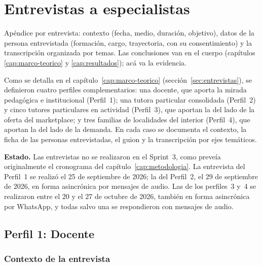 
\chapter{Entrevistas a especialistas}\label{apx:entrevista}

\begin{guia}
Apéndice por entrevista: contexto (fecha, medio, duración, objetivo),
datos de la persona entrevistada (formación, cargo, trayectoria, con su
consentimiento) y la transcripción organizada por temas. Las
conclusiones van en el cuerpo (capítulos \ref{cap:marco-teorico} y
\ref{cap:resultados}); acá va la evidencia.
\end{guia}

Como se detalla en el capítulo~\ref{cap:marco-teorico}
(sección~\ref{sec:entrevistas}), se definieron cuatro perfiles
complementarios: una docente, que aporta la mirada pedagógica e
institucional (Perfil~1); una tutora particular consolidada (Perfil~2) y
cinco tutores particulares en actividad (Perfil~3), que aportan la del
lado de la oferta del \gls{marketplace}; y tres familias de localidades
del interior (Perfil~4), que aportan la del lado de la demanda. En cada
caso se documenta el contexto, la ficha de las personas entrevistadas, el
guion y la transcripción por ejes temáticos.

\textbf{Estado.} Las entrevistas no se realizaron en el Sprint~3, como
preveía originalmente el cronograma del capítulo~\ref{cap:metodologia}.
La entrevista del Perfil~1 se realizó el 25 de septiembre de 2026; la del
Perfil~2, el 29 de septiembre de 2026, en forma asincrónica por mensajes
de audio. Las de los perfiles~3 y~4 se realizaron entre el 20 y el 27 de octubre de 2026, también
en forma asincrónica por WhatsApp, y todas salvo una se respondieron con
mensajes de audio.

\section{Perfil 1: Docente}

\subsection{Contexto de la entrevista}


